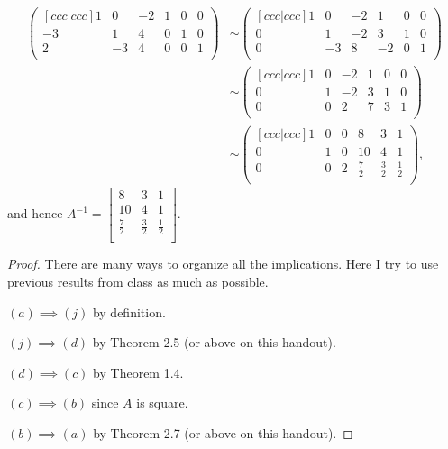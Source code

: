\documentclass[12pt,letterpaper]{article}
\begin{document}
\begin{enumerate}
\begin{enumerate}
\begin{align*}
	\begin{pmatrix}[ccc|ccc]
		1 & 0 & -2 & 1 & 0 & 0\\
		-3 &1 & 4 & 0 & 1 & 0\\
		2 &-3 & 4 & 0 & 0 &1\\
	\end{pmatrix}& \sim  \begin{pmatrix}[ccc|ccc]
		1 & 0 & -2 & 1 & 0 & 0\\
		0 &1 & -2 & 3 & 1 & 0\\
		0 & -3 & 8 & -2 & 0 &1\\
	\end{pmatrix}\\ &\sim \begin{pmatrix}[ccc|ccc]
		1 & 0 & -2 & 1 & 0 & 0\\
		0 &1 & -2 & 3 & 1 & 0\\
		0 &0 & 2 & 7 & 3 &1\\
	\end{pmatrix}\\ &\sim
\begin{pmatrix}[ccc|ccc]
	1 & 0 & 0 & 8 & 3 &1 \\
	0 &1 & 0 & 10 & 4 & 1\\
	0 &0 & 2 & \frac{7}{2} & \frac{3}{2} &\frac{1}{2}\\
\end{pmatrix},
\end{align*}
and hence $A^{-1}=\begin{bmatrix}
8 & 3 & 1\\
10 & 4 & 1\\
\frac{7}{2} & \frac{3}{2} & \frac{1}{2}\\
\end{bmatrix}.$

\end{enumerate}
  
  \Answer 
  
 \begin{proof} There are many ways to organize all the implications. Here I try to use previous results from class as much as possible.
 
 $(a)\implies (j)$ by definition.
 
 $(j) \implies (d)$ by Theorem 2.5 (or above on this handout).
 
 $(d) \implies (c)$ by Theorem 1.4.
 
 $(c) \implies (b)$ since $A$ is square.
 
 $(b) \implies (a)$ by Theorem 2.7 (or above on this handout).
 

\end{proof}
\end{enumerate}
\end{document}
